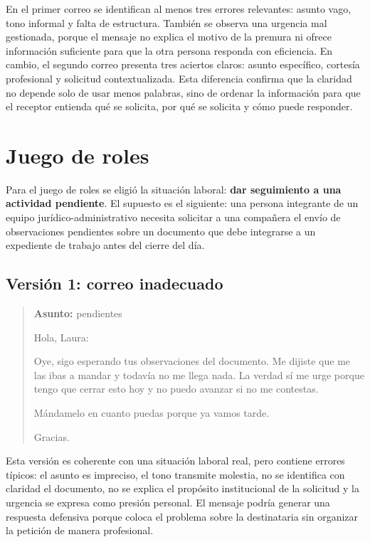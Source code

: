 \documentclass[
	spanish,
	letterpaper, oneside
]{article}
\begin{document}
En el primer correo se identifican al menos tres errores relevantes: asunto vago, tono informal y falta de estructura. También se observa una urgencia mal gestionada, porque el mensaje no explica el motivo de la premura ni ofrece información suficiente para que la otra persona responda con eficiencia. En cambio, el segundo correo presenta tres aciertos claros: asunto específico, cortesía profesional y solicitud contextualizada. Esta diferencia confirma que la claridad no depende solo de usar menos palabras, sino de ordenar la información para que el receptor entienda qué se solicita, por qué se solicita y cómo puede responder.

\section{Juego de roles}

Para el juego de roles se eligió la situación laboral: \textbf{dar seguimiento a una actividad pendiente}. El supuesto es el siguiente: una persona integrante de un equipo jurídico-administrativo necesita solicitar a una compañera el envío de observaciones pendientes sobre un documento que debe integrarse a un expediente de trabajo antes del cierre del día.

\subsection{Versión 1: correo inadecuado}

\begin{quote}
\textbf{Asunto:} pendientes

Hola, Laura:

Oye, sigo esperando tus observaciones del documento. Me dijiste que me las ibas a mandar y todavía no me llega nada. La verdad sí me urge porque tengo que cerrar esto hoy y no puedo avanzar si no me contestas.

Mándamelo en cuanto puedas porque ya vamos tarde.

Gracias.
\end{quote}

Esta versión es coherente con una situación laboral real, pero contiene errores típicos: el asunto es impreciso, el tono transmite molestia, no se identifica con claridad el documento, no se explica el propósito institucional de la solicitud y la urgencia se expresa como presión personal. El mensaje podría generar una respuesta defensiva porque coloca el problema sobre la destinataria sin organizar la petición de manera profesional.
\end{document}
